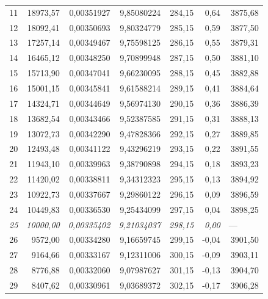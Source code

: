 \documentclass[12pt,a4paper,final,twoside,fleqn]{article}
\begin{document}
\begin{ThreePartTable}
\begin{longtable}{rrrrrrr}
11           & 18973,57  & 0,00351927    & 9,85080224  & 284,15     & 0,64       & 3875,68 \\
12           & 18092,41  & 0,00350693    & 9,80324779  & 285,15     & 0,59       & 3877,50 \\
13           & 17257,14  & 0,00349467    & 9,75598125  & 286,15     & 0,55       & 3879,31 \\
14           & 16465,12  & 0,00348250    & 9,70899948  & 287,15     & 0,50       & 3881,10 \\
15           & 15713,90  & 0,00347041    & 9,66230095  & 288,15     & 0,45       & 3882,88 \\
16           & 15001,15  & 0,00345841    & 9,61588214  & 289,15     & 0,41       & 3884,64 \\
17           & 14324,71  & 0,00344649    & 9,56974130  & 290,15     & 0,36       & 3886,39 \\
18           & 13682,54  & 0,00343466    & 9,52387585  & 291,15     & 0,31       & 3888,13 \\
19           & 13072,73  & 0,00342290    & 9,47828366  & 292,15     & 0,27       & 3889,85 \\
20           & 12493,48  & 0,00341122    & 9,43296219  & 293,15     & 0,22       & 3891,55 \\
21           & 11943,10  & 0,00339963    & 9,38790898  & 294,15     & 0,18       & 3893,23 \\
22           & 11420,02  & 0,00338811    & 9,34312323  & 295,15     & 0,13       & 3894,92 \\
23           & 10922,73  & 0,00337667    & 9,29860122  & 296,15     & 0,09       & 3896,59 \\
24           & 10449,83  & 0,00336530    & 9,25434099  & 297,15     & 0,04       & 3898,25 \\
\textsl{25}           & \textsl{10000,00}  & \textsl{0,00335402}    & \textsl{9,21034037}  & \textsl{298,15}     & \textsl{0,00}       &   ---\tnote{}\ \ \ \ \     \\
26           & 9572,00   & 0,00334280    & 9,16659745  & 299,15     & -0,04      & 3901,50 \\
27           & 9164,66   & 0,00333167    & 9,12311006  & 300,15     & -0,09      & 3903,11 \\
28           & 8776,88   & 0,00332060    & 9,07987627  & 301,15     & -0,13      & 3904,70 \\
29           & 8407,62   & 0,00330961    & 9,03689372  & 302,15     & -0,17      & 3906,28 \\

\end{longtable}
\end{ThreePartTable}
\end{document}

